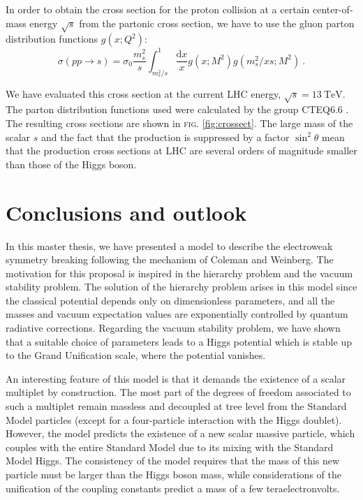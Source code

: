 \documentclass[aps,prd,preprintnumbers,nofootinbibn,twocolumn]{revtex4}
\newcommand{\dif}{\mathrm{d}}
\begin{document}
In order to obtain the cross section for the proton collision at a certain center-of-mass energy $\sqrt{s}$ from the partonic cross section, we have to use the gluon parton distribution functions $g(x; Q^2)$:
\begin{equation}
\sigma(pp\to s) = \sigma_0 \frac{m_s^2}{s} \int_{m_s^2/s}^1\frac{\dif x}{x} g(x; M^2) g(m_s^2/xs; M^2) \ .
\end{equation}



We have evaluated this cross section at the current LHC energy, $\sqrt{s}=\SI{13}{\tera\electronvolt}$. The parton distribution functions used were calculated by the group \textsc{CTEQ6.6} \cite{Nadolsky:2008zw}. The resulting cross sections are shown in \textsc{fig.} \ref{fig:crossect}. The large mass of the scalar $s$ and the fact that the production is suppressed by a factor $\sin^2\theta$ mean that the production cross sections at LHC are several orders of magnitude smaller than those of the Higgs boson.


\section{Conclusions and outlook}\label{sect:conclusion}
In this master thesis, we have presented a model to describe the electroweak symmetry breaking following the mechanism of Coleman and Weinberg. The motivation for this proposal is inspired in the hierarchy problem and the vacuum stability problem. The solution of the hierarchy problem arises in this model since the classical potential depends only on dimensionless parameters, and all the masses and vacuum expectation values are exponentially controlled by quantum radiative corrections. Regarding the vacuum stability problem, we have shown that a suitable choice of parameters leads to a Higgs potential which is stable up to the Grand Unification scale, where the potential vanishes.

An interesting feature of this model is that it demands the existence of a scalar multiplet by construction. The most part of the degrees of freedom associated to such a multiplet remain massless and decoupled at tree level from the Standard Model particles (except for a four-particle interaction with the Higgs doublet). However, the model predicts the existence of a new scalar massive particle, which couples with the entire Standard Model due to its mixing with the Standard Model Higgs. The consistency of the model requires that the mass of this new particle must be larger than the Higgs boson mass, while considerations of the unification of the coupling constants predict a mass of a few teraelectronvolts.
\end{document}
